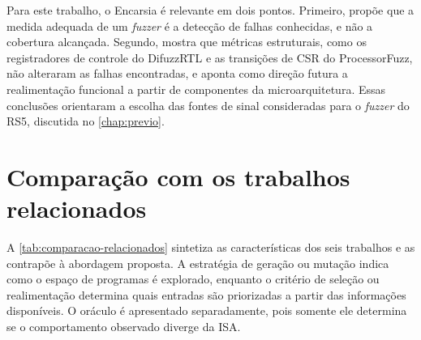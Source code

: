 Para este trabalho, o Encarsia é relevante em dois pontos. Primeiro, propõe que a medida adequada de um \textit{fuzzer} é a detecção de falhas conhecidas, e não a cobertura alcançada. Segundo, mostra que métricas estruturais, como os registradores de controle do DifuzzRTL e as transições de CSR do ProcessorFuzz, não alteraram as falhas encontradas, e aponta como direção futura a realimentação funcional a partir de componentes da microarquitetura. Essas conclusões orientaram a escolha das fontes de sinal consideradas para o \textit{fuzzer} do RS5, discutida no \cref{chap:previo}.
\section{\label{sec:compare}Comparação com os trabalhos relacionados}

A \cref{tab:comparacao-relacionados} sintetiza as características dos seis trabalhos e as contrapõe à abordagem proposta. A estratégia de geração ou mutação indica como o espaço de programas é explorado, enquanto o critério de seleção ou realimentação determina quais entradas são priorizadas a partir das informações disponíveis. O oráculo é apresentado separadamente, pois somente ele determina se o comportamento observado diverge da ISA.

